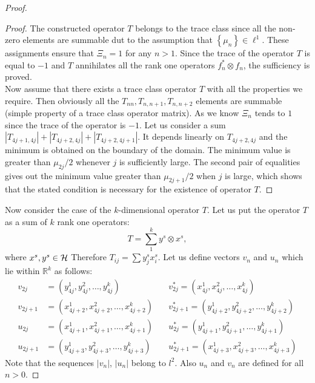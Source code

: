 \documentclass[12pt]{amsart}
\theoremstyle{case}
\begin{document}
\begin{proof}
\begin{proof}
          The constructed operator $T$ belongs to the trace class since all the non-zero elements are summable 
            dut to the assumption that $\left\{\mu_n\right\} \in \ell^1$.
          These assignments ensure that $\Xi_n = 1$ for any $n > 1$.
          Since the trace of the operator $T$ is equal to $-1$ and $T$ annihilates all the rank one operators $f^*_n \otimes f_n$,
            the sufficiency is proved.
          \medskip\\
          Now assume that there exists a trace class operator $T$ with all the properties we require.
          Then obviously all the $T_{nn}, T_{n, n+1}, T_{n, n+2}$ elements are summable (simple property of a trace class operator matrix).
          As we know $\Xi_n$ tends to $1$ since the trace of the operator is $-1$. Let us consider a sum
          $|T_{4j+1, 4j}| + |T_{4j+2,4j}| + |T_{4j+2,4j+1}|$. It depends linearly on $T_{4j+2, 4j}$ and the minimum
          is obtained on the boundary of the domain. The minimum value is greater than $\mu_{2j}/2$ whenever $j$ is
          sufficiently large.
          The second pair of equalities gives out the minimum value greater than $\mu_{2j+1}/2$ when $j$ is large,
          which shows that the stated condition is necessary for the existence of operator $T$.
      \end{proof}
      Now consider the case of the $k$-dimensional operator $T$.
      Let us put the operator $T$ as a sum of $k$ rank one operators:
      $$
          T = \sum_1^k y^s \otimes x^s,
      $$
      where $x^s, y^s \in \cal{H}$
      Therefore $T_{ij} = \sum {y^s_j x^s_i}$.
      Let us define vectors $v_n$ and $u_n$ which lie within $\mathbb{R}^k$ as follows:
      \begin{align*}
          v_{2j} &= (y^1_{4j}, y^2_{4j}, \dots ,y^k_{4j}) \quad
          &v^*_{2j} = (x^1_{4j}, x^2_{4j}, \dots ,x^k_{4j}) \\
          v_{2j+1} &= (x^1_{4j+2}, x^2_{4j+2}, \dots ,x^k_{4j+2}) \quad
          &v^*_{2j+1} = (y^1_{4j+2}, y^2_{4j+2}, \dots ,y^k_{4j+2}) \\
          u_{2j} &= (x^1_{4j+1}, x^2_{4j+1}, \dots ,x^k_{4j+1}) \quad
          &u^*_{2j} = (y^1_{4j+1}, y^2_{4j+1}, \dots ,y^k_{4j+1}) \\
          u_{2j+1} &= (y^1_{4j+3}, y^2_{4j+3}, \dots ,y^k_{4j+3}) \quad
          &u^*_{2j+1} = (x^1_{4j+3}, x^2_{4j+3}, \dots ,x^k_{4j+3}) 
      \end{align*}
      Note that the sequences $|v_n|$, $|u_n|$ belong to $l^2$. Also $u_n$ and $v_n$ are defined for all $n > 0$.

\end{proof}
\end{document}
